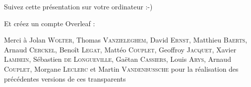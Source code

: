 \begin{frame}
  \begin{center}\Large
  Suivez cette présentation sur votre ordinateur :-)

  \vspace{1cm}


  \vspace{1cm}

  Et créez un compte Overleaf :

  \vspace{1cm}

  \end{center}
\end{frame}


\begin{frame}
  \maketitle
  Merci à Jolan \textsc{Wolter}, Thomas \textsc{Vanzieleghem}, David \textsc{Ernst}, Matthieu \textsc{Baerts}, Arnaud \textsc{Cerckel}, Benoît \textsc{Legat}, Mattéo \textsc{Couplet}, Geoffroy \textsc{Jacquet}, Xavier \textsc{Lambein}, Sébastien \textsc{de Longueville}, Gaëtan \textsc{Cassiers}, Louis \textsc{Arys}, Arnaud \textsc{Couplet}, Morgane \textsc{Leclerc} et Martin \textsc{Vandenbussche} pour la réalisation des précédentes versions de ces transparents
\end{frame}
